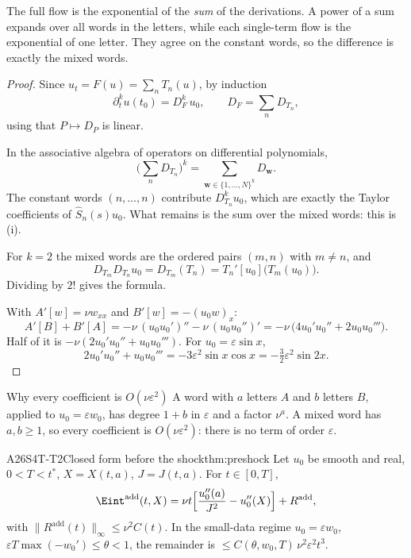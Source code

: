 \begin{proofidea}
The full flow is the exponential of the \emph{sum} of the derivations. A power of a sum expands over all words in the letters, while each single-term flow is the exponential of one letter. They agree on the constant words, so the difference is exactly the mixed words.
\end{proofidea}

\begin{proof}
Since $u_t=F(u)=\sum_nT_n(u)$, by induction
\[
\partial_t^ku(t_0)=D_F^k\,u_0,\qquad D_F=\sum_nD_{T_n},
\]
using that $P\mapsto D_P$ is linear.

In the associative algebra of operators on differential polynomials,
\[
\Big(\sum_nD_{T_n}\Big)^k=\sum_{\mathbf w\in\{1,\dots,N\}^k}D_{\mathbf w}.
\]
The constant words $(n,\dots,n)$ contribute $D_{T_n}^ku_0$, which are exactly the Taylor coefficients of $\hat S_n(s)u_0$. What remains is the sum over the mixed words: this is (i).

For $k=2$ the mixed words are the ordered pairs $(m,n)$ with $m\ne n$, and
\[
D_{T_m}D_{T_n}u_0=D_{T_m}(T_n)=T_n'[u_0]\big(T_m(u_0)\big).
\]
Dividing by $2!$ gives the formula.

With $A'[w]=\nu w_{xx}$ and $B'[w]=-(u_0w)_x$:
\[
A'[B]+B'[A]=-\nu\,(u_0u_0')''-\nu\,(u_0u_0'')'=-\nu\,\big(4u_0'u_0''+2u_0u_0'''\big).
\]
Half of it is $-\nu(2u_0'u_0''+u_0u_0''')$. For $u_0=\varepsilon\sin x$,
\[
2u_0'u_0''+u_0u_0'''=-3\varepsilon^2\sin x\cos x=-\tfrac32\varepsilon^2\sin2x .
\]

\end{proof}

\begin{aside}{Why every coefficient is $O(\nu\varepsilon^2)$}
A word with $a$ letters $A$ and $b$ letters $B$, applied to $u_0=\varepsilon w_0$, has degree $1+b$ in $\varepsilon$ and a factor $\nu^a$. A mixed word has $a,b\ge1$, so every coefficient is $O(\nu\varepsilon^2)$: there is no term of order $\varepsilon$.
\end{aside}

\begin{dimcard}{A26}{S4T-T2}{Closed form before the shock}{\proved}{thm:preshock}
Let $u_0$ be smooth and real, $0<T<t^*$, $X=X(t,a)$, $J=J(t,a)$. For $t\in[0,T]$,
\[
\Eint^{\mathrm{add}}(t,X)=\nu t\Big[\frac{u_0''(a)}{J^2}-u_0''(X)\Big]+R^{\mathrm{add}},
\]
with $\|R^{\mathrm{add}}(t)\|_\infty\le\nu^2C(t)$. In the small-data regime $u_0=\varepsilon w_0$, $\varepsilon T\max(-w_0')\le\theta<1$, the remainder is $\le C(\theta,w_0,T)\,\nu^2\varepsilon^2t^3$.
\end{dimcard}

